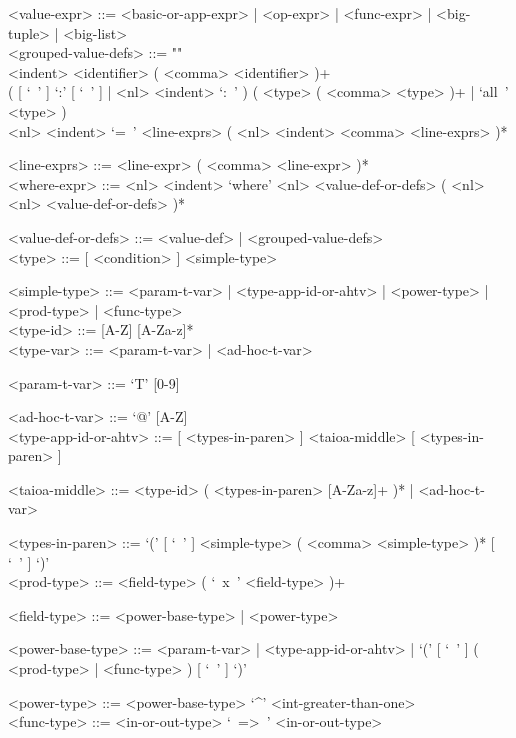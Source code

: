 \documentclass{article}
\begin{document}
\begin{grammar}
<value-expr> ::=
<basic-or-app-expr> | <op-expr> | <func-expr> | <big-tuple> | <big-list>
\\

<grouped-value-defs> ::= ""\\
<indent> <identifier> ( <comma> <identifier> )+ \\
( [ `\ ' ] `:' [ `\ ' ] | <nl> <indent> `:\ ' )
( <type> ( <comma> <type> )+ | `all\ ' <type> ) \\
<nl> <indent> `=\ ' <line-exprs> ( <nl> <indent> <comma> <line-exprs> )*

<line-exprs> ::= <line-expr> ( <comma> <line-expr> )*
\\

<where-expr> ::=
<nl> <indent> `where'
<nl> <value-def-or-defs> ( <nl> <nl> <value-def-or-defs> )*

<value-def-or-defs> ::= <value-def> | <grouped-value-defs>
\\

<type> ::= [ <condition> ]  <simple-type>

<simple-type> ::=
<param-t-var> | <type-app-id-or-ahtv> | <power-type> | <prod-type> |
<func-type>
\\

<type-id> ::= [A-Z] [A-Za-z]*
\\

<type-var> ::= <param-t-var> | <ad-hoc-t-var>

<param-t-var> ::= `T' [0-9]

<ad-hoc-t-var> ::= `@' [A-Z]
\\

<type-app-id-or-ahtv> ::=
[ <types-in-paren> ] <taioa-middle> [ <types-in-paren> ]

<taioa-middle> ::=
<type-id> ( <types-in-paren> [A-Za-z]+ )* | <ad-hoc-t-var>

<types-in-paren> ::=
`(' [ `\ ' ] <simple-type> ( <comma> <simple-type> )* [ `\ ' ] `)'
\\

<prod-type> ::= <field-type> ( `\ x\ ' <field-type> )+

<field-type> ::= <power-base-type> | <power-type>

<power-base-type> ::=
<param-t-var> | <type-app-id-or-ahtv> |
`(' [ `\ ' ] ( <prod-type> | <func-type> ) [ `\ ' ] `)'

<power-type> ::= <power-base-type> `^' <int-greater-than-one>
\\

<func-type> ::= <in-or-out-type> `\ =>\ ' <in-or-out-type>


\end{grammar}
\end{document}
